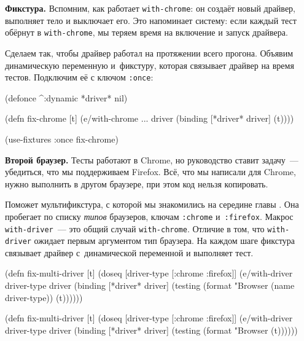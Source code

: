 
\textbf{Фикстура.} Вспомним, как работает \verb|with-chrome|: он создаёт новый
драйвер, выполняет тело и выключает его. Это напоминает систему: если каждый
тест обёрнут в \verb|with-chrome|, мы теряем время на включение и запуск
драйвера.

Сделаем так, чтобы драйвер работал на протяжении всего прогона. Объявим
динамическую переменную и~фикстуру, которая связывает драйвер на время
тестов. Подключим её с ключом \verb|:once|:

\begin{english}
  \begin{clojure}
(defonce ^:dynamic *driver* nil)

(defn fix-chrome [t]
  (e/with-chrome {...} driver
    (binding [*driver* driver]
      (t))))

(use-fixtures :once fix-chrome)
  \end{clojure}
\end{english}

\textbf{Второй браузер.} Тесты работают в Chrome, но руководство ставит
задачу~--- убедиться, что мы поддерживаем Firefox. Всё, что мы написали для
Chrome, нужно выполнить в другом браузере, при этом код нельзя копировать.

Поможет мультификстура, с которой мы знакомились на середине
главы . Она пробегает по списку \emph{типов} браузеров,
ключам \verb|:chrome| и~\verb|:firefox|. Макрос \verb|with-driver|~--- это общий
случай \verb|with-chrome|. Отличие в том, что \verb|with-driver| ожидает первым
аргументом тип браузера. На каждом шаге фикстура связывает драйвер
с~динамической переменной и выполняет тест.

\ifx\devicetype\mobile

\begin{english}
  \begin{clojure}
(defn fix-multi-driver [t]
  (doseq [driver-type [:chrome :firefox]]
    (e/with-driver driver-type {} driver
      (binding [*driver* driver]
        (testing (format "Browser %
                   (name driver-type))
          (t))))))
  \end{clojure}
\end{english}

\else

\begin{english}
  \begin{clojure}
(defn fix-multi-driver [t]
  (doseq [driver-type [:chrome :firefox]]
    (e/with-driver driver-type {} driver
      (binding [*driver* driver]
        (testing (format "Browser %
          (t))))))
  \end{clojure}
\end{english}

